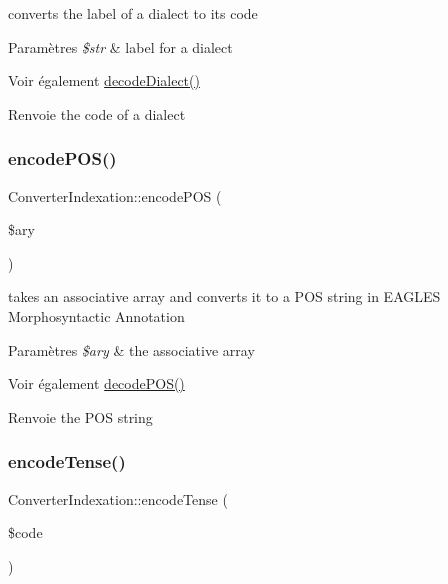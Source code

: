 converts the label of a dialect to its code 


\begin{DoxyParams}{Paramètres}
{\em \$str} & label for a dialect \\
\hline
\end{DoxyParams}
\begin{DoxySeeAlso}{Voir également}
\hyperlink{class_converter_indexation_a138e9e08f03d5a14fc53d367c9c739de}{decode\+Dialect()} 
\end{DoxySeeAlso}
\begin{DoxyReturn}{Renvoie}
the code of a dialect 
\end{DoxyReturn}
\hypertarget{class_converter_indexation_a8b52ecc585f7423456ae6aaf5df2436f}{}\label{class_converter_indexation_a8b52ecc585f7423456ae6aaf5df2436f} 
\subsubsection{\texorpdfstring{encode\+P\+O\+S()}{encodePOS()}}
{\footnotesize\ttfamily Converter\+Indexation\+::encode\+P\+OS (\begin{DoxyParamCaption}\item[{}]{\$ary }\end{DoxyParamCaption})}



takes an associative array and converts it to a P\+OS string in E\+A\+G\+L\+ES Morphosyntactic Annotation 


\begin{DoxyParams}{Paramètres}
{\em \$ary} & the associative array \\
\hline
\end{DoxyParams}
\begin{DoxySeeAlso}{Voir également}
\hyperlink{class_converter_indexation_a6012e4df4619a7cc1c55c811fc50690d}{decode\+P\+O\+S()} 
\end{DoxySeeAlso}
\begin{DoxyReturn}{Renvoie}
the P\+OS string 
\end{DoxyReturn}
\hypertarget{class_converter_indexation_aeabe347658ec9c09bf8ca65262ef6fa8}{}\label{class_converter_indexation_aeabe347658ec9c09bf8ca65262ef6fa8} 
\subsubsection{\texorpdfstring{encode\+Tense()}{encodeTense()}}
{\footnotesize\ttfamily Converter\+Indexation\+::encode\+Tense (\begin{DoxyParamCaption}\item[{}]{\$code }\end{DoxyParamCaption})}



